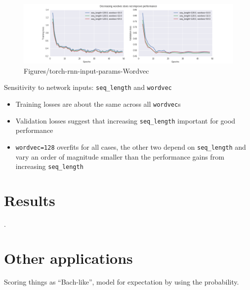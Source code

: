 \documentclass[dissertation.tex]{subfiles}
\begin{document}
\begin{figure}[htpb]
  \centering
  \includegraphics[width=1.0\linewidth]{Figures/torch-rnn-input-params-wordvec.png}
  \caption{Figures/torch-rnn-input-params-Wordvec}
  \label{fig:Figures/torch-rnn-input-params-wordvec}
\end{figure}

Sensitivity to network inputs: \texttt{seq\_length} and \texttt{wordvec}
\begin{itemize}
    \item Training losses are about the same across all \texttt{wordvec}s
    \item Validation losses suggest that increasing \texttt{seq\_length} important for
        good performance 
    \item \texttt{wordvec=128} overfits for all cases, the other two depend on
        \texttt{seq\_length} and vary an order of magnitude smaller than the
        performance gains from increasing \texttt{seq\_length}
\end{itemize}

\section{Results}

.


\section{Other applications}

Scoring things as ``Bach-like'', model for expectation by using the probability.

\printbibliography
\end{document}
